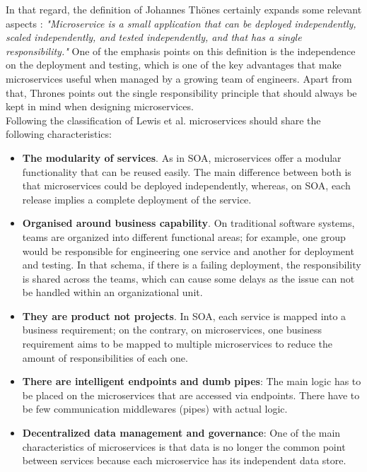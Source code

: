 \documentclass[english, 12pt, a4paper, sci, utf8, a-1b, online]{aaltothesis}
\begin{document}
In that regard, the definition of Johannes Thönes certainly expands some relevant aspects \cite{thones2015microservices}: \textit{"Microservice is a small application that can be deployed independently, scaled independently, and tested independently, and that has a single responsibility."} One of the emphasis points on this definition is the independence on the deployment and testing, which is one of the key advantages that make microservices useful when managed by a growing team of engineers. Apart from that, Thrones points out the single responsibility principle that should always be kept in mind when designing microservices.\\

Following the classification of Lewis et al. \cite{MicroservicesCharacteristics} microservices should share the following characteristics:

\begin{itemize}
    \item \textbf{The modularity of services}. As in SOA, microservices offer a modular functionality that can be reused easily. The main difference between both is that microservices could be deployed independently, whereas, on SOA, each release implies a complete deployment of the service.
    \item \textbf{Organised around business capability}. On traditional software systems, teams are organized into different functional areas; for example, one group would be responsible for engineering one service and another for deployment and testing. In that schema, if there is a failing deployment, the responsibility is shared across the teams, which can cause some delays as the issue can not be handled within an organizational unit.
    \item \textbf{They are product not projects}. In SOA, each service is mapped into a business requirement; on the contrary, on microservices, one business requirement aims to be mapped to multiple microservices to reduce the amount of responsibilities of each one.
    \item \textbf{There are intelligent endpoints and dumb pipes}: The main logic has to be placed on the microservices that are accessed via endpoints. There have to be few communication middlewares (pipes) with actual logic.
    \item \textbf{Decentralized data management and governance}: One of the main characteristics of microservices is that data is no longer the common point between services because each microservice has its independent data store.
\end{itemize}
\end{document}

